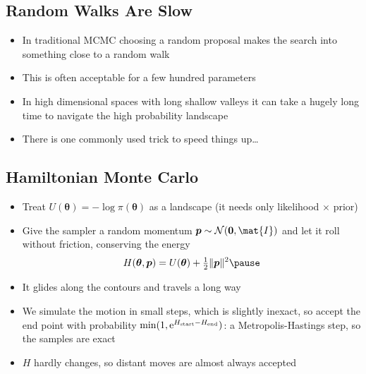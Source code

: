 \begin{slide}
\section{Random Walks Are Slow}


\begin{PauseHighLight}
  \begin{itemize}
  \item In traditional MCMC choosing a random proposal makes the
    search into something close to a random walk\pause
  \item This is often acceptable for a few hundred parameters\pause
  \item In high dimensional spaces with long shallow valleys it can
    take a hugely long time to navigate the high probability
    landscape\pause
  \item There is one commonly used trick to speed things up\ldots\pause
  \end{itemize}
\end{PauseHighLight}


\end{slide}



\begin{slide}
\section[-1]{Hamiltonian Monte Carlo}

\begin{PauseHighLight}
  \begin{itemize}
  \item Treat $U(\bm{\theta}) = -\log\pi(\bm{\theta})$ as a landscape
    (it needs only likelihood $\times$ prior)\pause
  \item Give the sampler a random momentum $\bm{p}\sim\mathcal{N}(\bm{0},\mat{I})$
    and let it roll without friction, conserving the energy
    \begin{align*}
      H(\bm{\theta},\bm{p}) = U(\bm{\theta}) + \tfrac12\|\bm{p}\|^2\pause
    \end{align*}
  \item It glides along the contours and travels a long way\pause
  \item We simulate the motion in small steps, which is slightly
    inexact, so accept the end point with probability
    $\min(1, {\rm e}^{H_{\text{start}} - H_{\text{end}}})$\pause{}: a
    Metropolis-Hastings step, so the samples are exact\pauseb
  \item $H$ hardly changes, so distant moves are almost always
    accepted\pause
  \end{itemize}
\end{PauseHighLight}

\end{slide}

